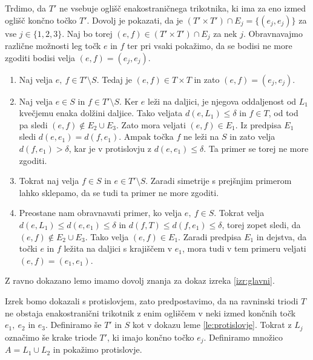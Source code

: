 \documentclass[mat1]{fmfdelo}
\begin{document}
Trdimo, da $T'$ ne vsebuje oglišč enakostraničnega trikotnika, ki ima za eno izmed oglišč končno točko $T'$. Dovolj je pokazati, da je $(T' \times T') \cap E_j = \{(e_j, e_j)\}$ za vse $j \in \{1, 2, 3\}$. Naj bo torej $(e, f) \in (T' \times T') \cap E_j$ za nek $j$. Obravnavajmo različne možnosti leg točk $e$ in $f$ ter pri vsaki pokažimo, da se bodisi ne more zgoditi bodisi velja $(e, f) = (e_j, e_j)$.
\begin{enumerate}
\item Naj velja $e,\ f \in T' \setminus S$. Tedaj je $(e, f) \in T \times T$ in zato $(e, f) = (e_j, e_j)$.
\item Naj velja $e \in S$ in $f \in T' \setminus S$. Ker $e$ leži na daljici, je njegova oddaljenost od $L_1$ kvečjemu enaka dolžini daljice. Tako veljata $d(e, L_1)\leq \delta$ in $f \in T$, od tod pa sledi $(e, f) \notin E_2 \cup E_3$. Zato mora veljati $(e, f) \in E_1$. Iz predpisa $E_1$ sledi $d(e, e_1) = d(f, e_1)$. Ampak točka $f$ ne leži na $S$ in zato velja $d(f, e_1) > \delta$, kar je v protislovju z $d(e, e_1) \leq \delta$. Ta primer se torej ne more zgoditi.
\item Tokrat naj velja $f \in S$ in $e \in T' \setminus S$. Zaradi simetrije s prejšnjim primerom lahko sklepamo, da se tudi ta primer ne more zgoditi.
\item Preostane nam obravnavati primer, ko velja $e,\ f \in S$. Tokrat velja $d(e, L_1) \leq d(e, e_1) \leq \delta$ in $d(f, T) \leq d(f, e_1) \leq \delta$, torej zopet sledi, da $(e, f) \notin E_2 \cup E_3$. Tako velja $(e, f) \in E_1$. Zaradi predpisa $E_1$ in dejstva, da točki $e$ in $f$ ležita na daljici s krajiščem v $e_1$, mora tudi v tem primeru veljati $(e, f) = (e_1, e_1)$.
\end{enumerate}
\endproof

Z ravno dokazano lemo imamo dovolj znanja za dokaz izreka \ref{izr:glavni}.

Izrek bomo dokazali s protislovjem, zato predpostavimo, da na ravninski triodi $T$ ne obstaja enakostranični trikotnik z enim ogliščem v neki izmed končnih točk $e_1,\ e_2$ in $e_3$. Definiramo še $T'$ in $S$ kot v dokazu leme \ref{le:protislovje}. Tokrat z $L_j$ označimo še krake triode $T'$, ki imajo končno točko $e_j$. Definiramo množico $A = L_1 \cup L_2$ in pokažimo protislovje.

\begin{center}
\end{center}
\end{document}
